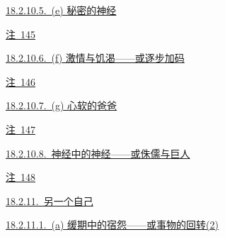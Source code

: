 \par\noindent\hspace*{2.70em}\hyperref[ch18:local:h58]{18.2.10.5.~(e) 秘密的神经}\nobreak\dotfill\nobreak\hyperref[ch18:local:h58]{\pageref*{ch18:local:h58}}\par
\par\noindent\hspace*{4.05em}\hyperref[ch18:local:n53]{注~145}\nobreak\dotfill\nobreak\hyperref[ch18:local:n53]{\pageref*{ch18:local:n53}}\par
\par\noindent\hspace*{2.70em}\hyperref[ch18:local:h59]{18.2.10.6.~(f) 激情与饥渴——或逐步加码}\nobreak\dotfill\nobreak\hyperref[ch18:local:h59]{\pageref*{ch18:local:h59}}\par
\par\noindent\hspace*{4.05em}\hyperref[ch18:local:n54]{注~146}\nobreak\dotfill\nobreak\hyperref[ch18:local:n54]{\pageref*{ch18:local:n54}}\par
\par\noindent\hspace*{2.70em}\hyperref[ch18:local:h60]{18.2.10.7.~(g) 心软的爸爸}\nobreak\dotfill\nobreak\hyperref[ch18:local:h60]{\pageref*{ch18:local:h60}}\par
\par\noindent\hspace*{4.05em}\hyperref[ch18:local:n55]{注~147}\nobreak\dotfill\nobreak\hyperref[ch18:local:n55]{\pageref*{ch18:local:n55}}\par
\par\noindent\hspace*{2.70em}\hyperref[ch18:local:h61]{18.2.10.8.~神经中的神经——或侏儒与巨人}\nobreak\dotfill\nobreak\hyperref[ch18:local:h61]{\pageref*{ch18:local:h61}}\par
\par\noindent\hspace*{4.05em}\hyperref[ch18:local:n56]{注~148}\nobreak\dotfill\nobreak\hyperref[ch18:local:n56]{\pageref*{ch18:local:n56}}\par
\par\noindent\hspace*{1.35em}\hyperref[ch18:local:h62]{18.2.11.~另一个自己}\nobreak\dotfill\nobreak\hyperref[ch18:local:h62]{\pageref*{ch18:local:h62}}\par
\par\noindent\hspace*{2.70em}\hyperref[ch18:local:h63]{18.2.11.1.~(a) 缓期中的宿怨——或事物的回转(2)}\nobreak\dotfill\nobreak\hyperref[ch18:local:h63]{\pageref*{ch18:local:h63}}\par
